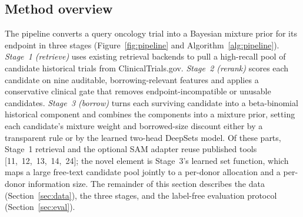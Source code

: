 \documentclass[11pt]{article}
\begin{document}
\subsection{Method overview}
\label{sec:overview}
The pipeline converts a query oncology trial into a Bayesian mixture prior for
its endpoint in three stages (Figure~\ref{fig:pipeline} and
Algorithm~\ref{alg:pipeline}). \emph{Stage~1 (retrieve)} uses existing retrieval
backends to pull a high-recall pool of candidate historical trials from
ClinicalTrials.gov. \emph{Stage~2 (rerank)} scores each candidate on nine
auditable, borrowing-relevant features and applies a conservative clinical gate
that removes endpoint-incompatible or unusable candidates. \emph{Stage~3
(borrow)} turns each surviving candidate into a beta-binomial historical
component and combines the components into a mixture prior, setting each
candidate's mixture weight and borrowed-size discount either by a
transparent rule or by the learned two-head DeepSets model. Of these parts,
Stage~1 retrieval and the optional SAM adapter reuse published tools
[11,~12,~13,~14,~24]; the novel element is Stage~3's learned set function, which
maps a large free-text candidate pool jointly to a per-donor allocation and a
per-donor information size. The remainder of this section describes the data
(Section~\ref{sec:data}), the three stages, and the label-free evaluation
protocol (Section~\ref{sec:eval}).
\end{document}
